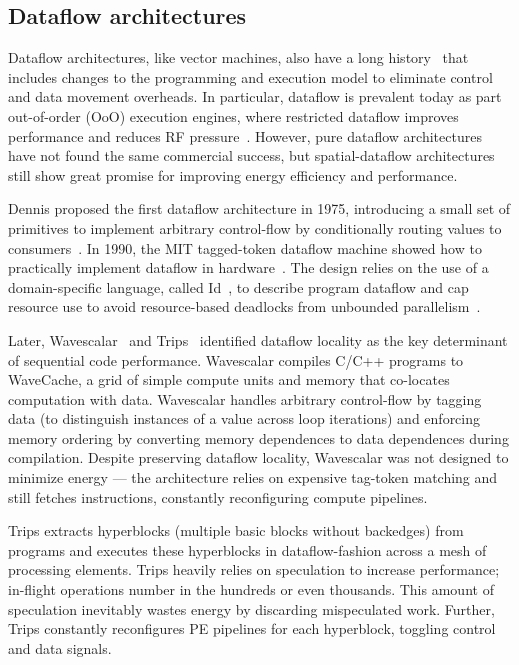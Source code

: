 \subsection{Dataflow architectures}
Dataflow architectures, like vector machines, also have a long history~\cite{dennis1975preliminary,dennis1980data,dennis1988efficient,ttda} that includes changes to the programming and execution model to eliminate control and data movement overheads.
% 
% 
In particular, dataflow is prevalent today as part out-of-order (OoO) execution engines, where restricted dataflow improves performance and reduces RF
pressure~\cite{bracy2004dataflow,sassone2004dynamic,kim2002instruction,sembrant2015long,acsiliouglu2015lazy}.
% 
However, pure dataflow architectures have not found the same commercial success, but spatial-dataflow architectures still show great promise for improving energy efficiency and performance.

Dennis proposed the first dataflow architecture in 1975, introducing a small set of primitives to implement arbitrary control-flow by conditionally routing values to consumers~\cite{dennis1975preliminary}.
% 
In 1990, the MIT tagged-token dataflow machine showed how to practically implement dataflow in hardware~\cite{nikhil1990executing}.
% 
The design relies on the use of a domain-specific language, called Id~\cite{id}, to describe program dataflow and cap resource use to avoid resource-based deadlocks from unbounded parallelism~\cite{monsoon}.

Later, Wavescalar~\cite{swanson2003wavescalar} and Trips~\cite{trips} identified dataflow locality as the key determinant of sequential code performance.
% 
Wavescalar compiles C/C++ programs to WaveCache, a grid of simple compute units and memory that co-locates computation with data.
% 
Wavescalar handles arbitrary control-flow by tagging data (to distinguish instances of a value across loop iterations) and enforcing memory ordering by  converting memory dependences to data dependences during compilation.
% 
Despite preserving dataflow locality, Wavescalar was not designed to minimize energy --- the architecture relies on expensive tag-token matching and still fetches instructions, constantly reconfiguring compute pipelines.

Trips extracts hyperblocks (multiple basic blocks without backedges) from programs and executes these hyperblocks in dataflow-fashion across a mesh of processing elements.
% 
Trips heavily relies on speculation to increase performance; in-flight operations number in the hundreds or even thousands.
% 
This amount of speculation inevitably wastes energy by discarding mispeculated work.
% 
Further, Trips constantly reconfigures PE pipelines for each hyperblock, toggling control and data signals.

